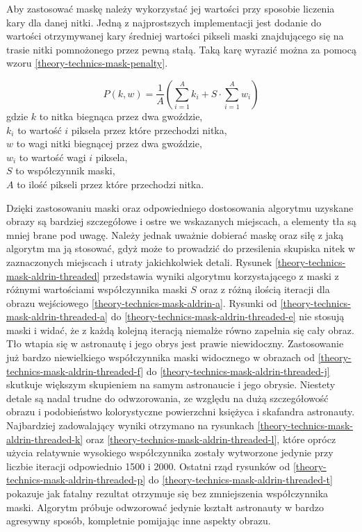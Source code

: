         Aby zastosować maskę należy wykorzystać jej wartości przy sposobie liczenia kary dla danej nitki. Jedną z najprostszych implementacji jest dodanie do wartości otrzymywanej kary średniej wartości pikseli maski znajdującego się na trasie nitki pomnożonego przez pewną stałą. Taką karę wyrazić można za pomocą wzoru \ref{theory-technics-mask-penalty}.
        
        \begin{equation} \label{theory-technics-mask-penalty}
            P(k, w) = \frac{1}{A} (\sum_{i=1}^A k_i + S \cdot \sum_{i=1}^A w_i)
        \end{equation}
        gdzie \(k\) to nitka biegnąca przez dwa gwoździe,\\
        \(k_i\) to wartość \(i\) piksela przez które przechodzi nitka,\\
        \(w\) to wagi nitki biegnącej przez dwa gwoździe,\\
        \(w_i\) to wartość wagi \(i\) piksela,\\
        \(S\) to współczynnik maski,\\
        \(A\) to ilość pikseli przez które przechodzi nitka.
        
        Dzięki zastosowaniu maski oraz odpowiedniego dostosowania algorytmu uzyskane obrazy są bardziej szczegółowe i ostre we wskazanych miejscach, a elementy tła są mniej brane pod uwagę. Należy jednak uważnie dobierać maskę oraz siłę z jaką algorytm ma ją stosować, gdyż może to prowadzić do przesilenia skupiska nitek w zaznaczonych miejscach i utraty jakichkolwiek detali. Rysunek \ref{theory-technics-mask-aldrin-threaded} przedstawia wyniki algorytmu korzystającego z maski z różnymi wartościami współczynnika maski \(S\) oraz z różną ilością iteracji dla obrazu wejściowego \ref{theory-technics-mask-aldrin-a}. Rysunki od \ref{theory-technics-mask-aldrin-threaded-a} do \ref{theory-technics-mask-aldrin-threaded-e} nie stosują maski i widać, że z każdą kolejną iteracją niemalże równo zapełnia się cały obraz. Tło wtapia się w astronautę i jego obrys jest prawie niewidoczny. Zastosowanie już bardzo niewielkiego współczynnika maski widocznego w obrazach od \ref{theory-technics-mask-aldrin-threaded-f} do \ref{theory-technics-mask-aldrin-threaded-j} skutkuje większym skupieniem na samym astronaucie i jego obrysie. Niestety detale są nadal trudne do odwzorowania, ze względu na dużą szczegółowość obrazu i podobieństwo kolorystyczne powierzchni księżyca i skafandra astronauty. Najbardziej zadowalający wyniki otrzymano na rysunkach \ref{theory-technics-mask-aldrin-threaded-k} oraz \ref{theory-technics-mask-aldrin-threaded-l}, które oprócz użycia relatywnie wysokiego współczynnika zostały wytworzone jedynie przy liczbie iteracji odpowiednio 1500 i 2000. Ostatni rząd rysunków od \ref{theory-technics-mask-aldrin-threaded-p} do \ref{theory-technics-mask-aldrin-threaded-t} pokazuje jak fatalny rezultat otrzymuje się bez zmniejszenia współczynnika maski. Algorytm próbuje odwzorować jedynie kształt astronauty w bardzo agresywny sposób, kompletnie pomijając inne aspekty obrazu.
        
